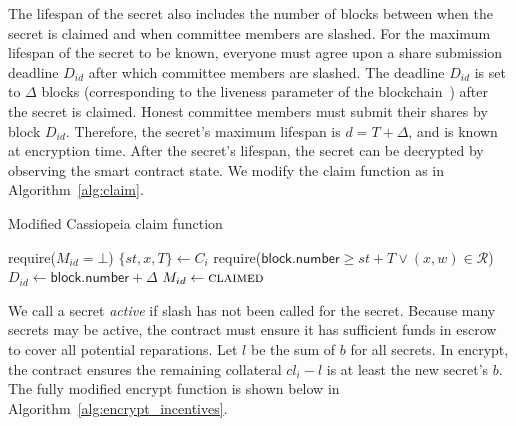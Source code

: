 The lifespan of the secret also includes the number of blocks between when the secret is claimed and when committee members are slashed.
For the maximum lifespan of the secret to be known, everyone must agree upon a share submission deadline $D_{id}$ after which committee members are slashed.
The deadline $D_{id}$ is set to $\Delta$ blocks (corresponding to the liveness parameter of the blockchain~\cite{backbone}) after the secret is claimed.
Honest committee members must submit their shares by block $D_{id}$.
Therefore, the secret's maximum lifespan is $d = T + \Delta$, and is known at encryption time.
After the secret's lifespan, the secret can be decrypted by observing the smart contract state.
We modify the \textsf{claim} function as in Algorithm~\ref{alg:claim}.

\begin{algorithm}[h]
\caption{Modified Cassiopeia \textsf{claim} function}
\label{alg:claim}
    \begin{algorithmic}[1]
                \State require($M_{id} = \bot$)
                \State $\{st, x, T\} \gets C_i$
                \State require($\textsf{block.number} \geq st + T \lor (x, w) \in \mathcal{R}$)
                \State $D_{id} \gets \textsf{block.number} + \Delta$
                \State $M_{id} \gets \textsc{claimed}$
            \EndFunction
    \end{algorithmic}
\end{algorithm}

We call a secret \emph{active} if \textsf{slash} has not been called for the secret.
Because many secrets may be active, the contract must ensure it has sufficient funds in escrow to cover all potential reparations.
Let $l$ be the sum of $b$ for all secrets.
In {\sf encrypt}, the contract ensures the remaining collateral $cl_i - l$ is at least the new secret's $b$.
The fully modified \textsf{encrypt} function is shown below in Algorithm~\ref{alg:encrypt_incentives}.

